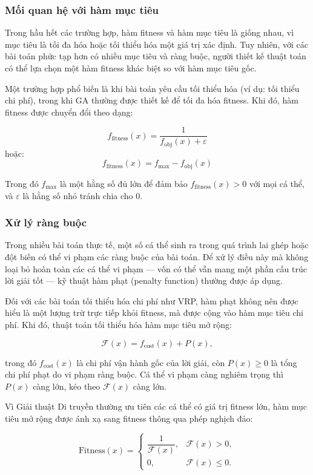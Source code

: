 \documentclass[12pt,a4paper]{article}
\numberwithin{figure}{subsection}
\renewcommand{\geq}{\geqslant}
\renewcommand{\leq}{\leqslant}
\begin{document}
\subsubsection{Mối quan hệ với hàm mục tiêu}

Trong hầu hết các trường hợp, hàm fitness và hàm mục tiêu là giống nhau, vì mục tiêu là tối đa hóa hoặc tối thiểu hóa một giá trị xác định. Tuy nhiên, với các bài toán phức tạp hơn có nhiều mục tiêu và ràng buộc, người thiết kế thuật toán có thể lựa chọn một hàm fitness khác biệt so với hàm mục tiêu gốc.

Một trường hợp phổ biến là khi bài toán yêu cầu tối thiểu hóa (ví dụ: tối thiểu chi phí), trong khi GA thường được thiết kế để tối đa hóa fitness. Khi đó, hàm fitness được chuyển đổi theo dạng:

\[
f_{\text{fitness}}(x) = \frac{1}{f_{\text{obj}}(x) + \varepsilon}
\]
hoặc:
\[
f_{\text{fitness}}(x) = f_{\max} - f_{\text{obj}}(x)
\]

Trong đó $f_{\max}$ là một hằng số đủ lớn để đảm bảo $f_{\text{fitness}}(x) > 0$ với mọi cá thể, và $\varepsilon$ là hằng số nhỏ tránh chia cho 0.

\subsubsection{Xử lý ràng buộc}

Trong nhiều bài toán thực tế, một số cá thể sinh ra trong quá trình lai ghép hoặc đột biến có thể vi phạm các ràng buộc của bài toán. Để xử lý điều này mà không loại bỏ hoàn toàn các cá thể vi phạm --- vốn có thể vẫn mang một phần cấu trúc lời giải tốt --- kỹ thuật hàm phạt (penalty function) thường được áp dụng.

Đối với các bài toán tối thiểu hóa chi phí như VRP, hàm phạt không nên được hiểu là một lượng trừ trực tiếp khỏi fitness, mà được cộng vào hàm mục tiêu chi phí. Khi đó, thuật toán tối thiểu hóa hàm mục tiêu mở rộng:

\[
\mathcal{F}(x)
=
f_{\text{cost}}(x)
+
P(x),
\]

trong đó $f_{\text{cost}}(x)$ là chi phí vận hành gốc của lời giải, còn $P(x) \geq 0$ là tổng chi phí phạt do vi phạm ràng buộc. Cá thể vi phạm càng nghiêm trọng thì $P(x)$ càng lớn, kéo theo $\mathcal{F}(x)$ càng lớn.

Vì Giải thuật Di truyền thường ưu tiên các cá thể có giá trị fitness lớn, hàm mục tiêu mở rộng được ánh xạ sang fitness thông qua phép nghịch đảo:

\[
\text{Fitness}(x)
=
\begin{cases}
\dfrac{1}{\mathcal{F}(x)}, & \mathcal{F}(x) > 0, \\[1.2ex]
0, & \mathcal{F}(x) \leq 0.
\end{cases}
\]
\end{document}
